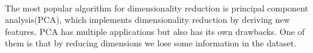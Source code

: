 \paragraph{}
The most popular algorithm for dimensionality reduction is principal component analysis(PCA), which implements dimensionality reduction by deriving new features. PCA has multiple applications but also has its own drawbacks. One of them is that by reducing dimensions we lose some information in the dataset\cite{Ruan2018}.






